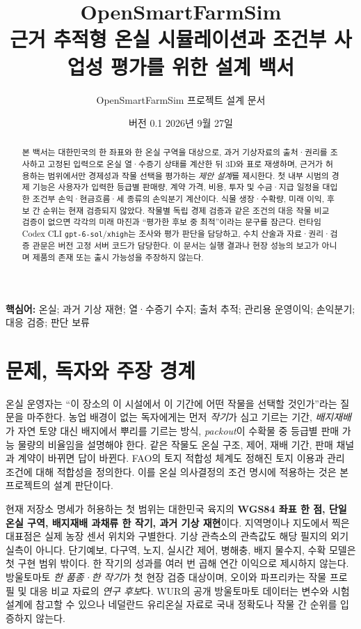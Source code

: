 \documentclass[11pt,a4paper]{article}
\title{\textbf{OpenSmartFarmSim}\\[0.35em]\large 근거 추적형 온실 시뮬레이션과 조건부 사업성 평가를 위한 설계 백서}
\author{OpenSmartFarmSim 프로젝트 설계 문서}
\date{버전 0.1 \quad 2026년 9월 27일\\[0.3em]\status}
\begin{document}
\maketitle
\begin{abstract}
본 백서는 대한민국의 한 좌표와 한 온실 구역을 대상으로, 과거 기상자료의 출처·권리를 조사하고 고정된 입력으로 온실 열·수증기 상태를 계산한 뒤 3D와 표로 재생하며, 근거가 허용하는 범위에서만 경제성과 작물 선택을 평가하는 \emph{제안 설계}를 제시한다. 첫 내부 시범의 경제 기능은 사용자가 입력한 등급별 판매량, 계약 가격, 비용, 투자 및 수금·지급 일정을 대입한 조건부 손익·현금흐름·세 종류의 손익분기 계산이다. 식물 생장·수확량, 미래 이익, 후보 간 순위는 현재 검증되지 않았다. 작물별 독립 경제 검증과 같은 조건의 대응 작물 비교 검증이 없으면 각각의 미래 마진과 ``평가한 후보 중 최적''이라는 문구를 잠근다. 런타임 Codex CLI \texttt{gpt-6-sol}/\texttt{xhigh}는 조사와 평가 판단을 담당하고, 수치 산술과 자료·권리·검증 관문은 버전 고정 서버 코드가 담당한다. 이 문서는 실행 결과나 현장 성능의 보고가 아니며 제품의 존재 또는 출시 가능성을 주장하지 않는다.
\end{abstract}
\noindent\textbf{핵심어:} 온실; 과거 기상 재현; 열·수증기 수지; 출처 추적; 관리용 운영이익; 손익분기; 대응 검증; 판단 보류

\tableofcontents
\clearpage

\section{문제, 독자와 주장 경계}
온실 운영자는 ``이 장소의 이 시설에서 이 기간에 어떤 작물을 선택할 것인가''라는 질문을 마주한다. 농업 배경이 없는 독자에게는 먼저 \emph{작기}가 심고 기르는 기간, \emph{배지재배}가 자연 토양 대신 배지에서 뿌리를 기르는 방식, \emph{packout}이 수확물 중 등급별 판매 가능 물량의 비율임을 설명해야 한다. 같은 작물도 온실 구조, 제어, 재배 기간, 판매 채널과 계약이 바뀌면 답이 바뀐다. FAO의 토지 적합성 체계도 정해진 토지 이용과 관리 조건에 대해 적합성을 정의한다. 이를 온실 의사결정의 조건 명시에 적용하는 것은 본 프로젝트의 설계 판단이다\cite{fao-land}.

현재 저장소 명세가 허용하는 첫 범위는 대한민국 육지의 \textbf{WGS84 좌표 한 점, 단일 온실 구역, 배지재배 과채류 한 작기, 과거 기상 재현}이다. 지역명이나 지도에서 찍은 대표점은 실제 농장 센서 위치와 구별한다. 기상 관측소의 관측값도 해당 필지의 외기 실측이 아니다. 단기예보, 다구역, 노지, 실시간 제어, 병해충, 배지 물수지, 수확 모델은 첫 구현 범위 밖이다. 한 작기의 성과를 여러 번 곱해 연간 이익으로 제시하지 않는다. 방울토마토 \emph{한 품종·한 작기}가 첫 현장 검증 대상이며, 오이와 파프리카는 작물 프로필 및 대응 비교 자료의 \emph{연구 후보}다. WUR의 공개 방울토마토 데이터는 변수와 시험 설계에 참고할 수 있으나 네덜란드 유리온실 자료로 국내 정확도나 작물 간 순위를 입증하지 않는다\cite{wur-data}.
\end{document}
